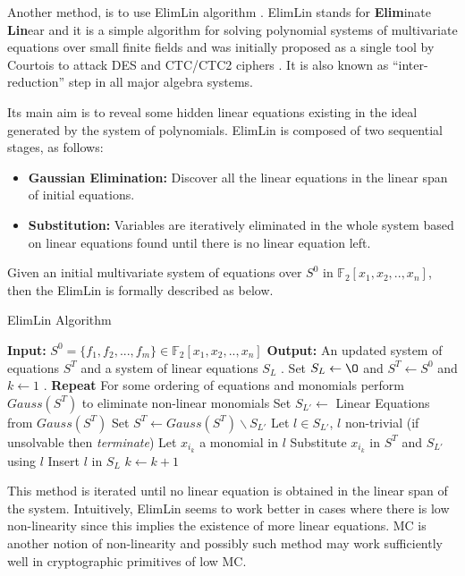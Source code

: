 Another method, is to use ElimLin algorithm \cite{ElimLinR}. ElimLin stands for \textbf{Elim}inate \textbf{Lin}ear and it is a simple algorithm for solving polynomial systems of multivariate equations over small finite fields and was initially proposed as a single tool by Courtois to attack DES and CTC/CTC2 ciphers \cite{DEScourtois}. It is also known as ``inter-reduction'' step in all major algebra systems.

Its main aim is to reveal some hidden linear equations existing in the ideal generated by the system of
polynomials. ElimLin is composed of two sequential stages, as follows:

\begin{itemize}
	\item \textbf{Gaussian Elimination:} Discover all the linear equations in the linear span of initial equations.
	\item \textbf{Substitution:} Variables are iteratively eliminated in the whole system based on linear equations found until there is no linear equation left.
\end{itemize}

Given an initial multivariate system of equations over $S^0$ in $\mathbb{F}_2[x_1,x_2,..,x_n]$, then the ElimLin is formally described as below.

\begin{algorithm}
	\caption{ElimLin Algorithm}
	\begin{algorithmic}
		\STATE \textbf{Input:} $S^0=\{f_1,f_2,...,f_m\} \in \mathbb{F}_2[x_1,x_2,..,x_n]$
		\STATE \textbf{Output:} An updated system of equations $S^T$ and a system of linear equations $S_L$
		. Set $S_L\leftarrow{\O}$ and $S^T \leftarrow S^0$ and $k\leftarrow 1$
		. \textbf{Repeat}
		\STATE For some ordering of equations and monomials perform $Gauss(S^T)$ to eliminate non-linear monomials
		\STATE Set $S_{L'} \leftarrow$ Linear Equations from $Gauss(S^T)$
		\STATE Set $S^T\leftarrow Gauss(S^T)\backslash S_{L'}$
		\STATE Let $l \in S_{L'}$, $l$ non-trivial (if unsolvable then \emph{terminate})
		\STATE Let $x_{i_k}$ a monomial in $l$
		\STATE Substitute $x_{i_k}$ in $S^T$ and $S_{L'}$ using $l$
		\STATE Insert $l$ in $S_L$
		\STATE $k\leftarrow k+1$
	\end{algorithmic}
\end{algorithm}

This method is iterated until no linear equation is obtained in the linear
span of the system. Intuitively, ElimLin seems to work better in cases where there is low
non-linearity since this implies the existence of more linear equations.
MC is another notion of non-linearity \cite{FourMNL,OptimiPaper2}
and possibly such method
may work sufficiently well in cryptographic primitives of low MC.


